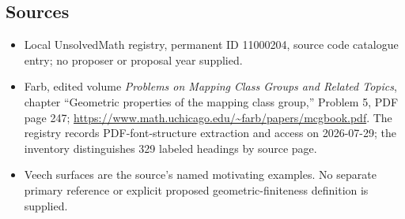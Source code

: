 \documentclass[11pt]{article}
\begin{document}
\subsection{Sources}
\begin{itemize}
\item Local UnsolvedMath registry, permanent ID 11000204, source code catalogue entry; no proposer or proposal year supplied.
\item Farb, edited volume \emph{Problems on Mapping Class Groups and Related Topics}, chapter ``Geometric properties of the mapping class group,'' Problem 5, PDF page 247; \url{https://www.math.uchicago.edu/~farb/papers/mcgbook.pdf}. The registry records PDF-font-structure extraction and access on 2026-07-29; the inventory distinguishes 329 labeled headings by source page.
\item Veech surfaces are the source's named motivating examples. No separate primary reference or explicit proposed geometric-finiteness definition is supplied.
\end{itemize}
\end{document}
